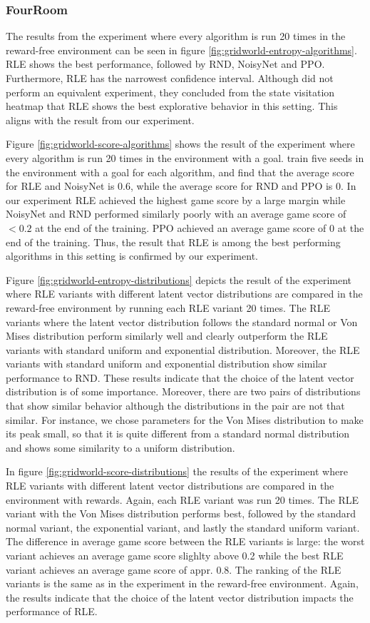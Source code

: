 \documentclass[10pt]{article} %
\begin{document}
\subsubsection{FourRoom}
The results from the experiment where every algorithm is run 20 times in the reward-free environment can be seen in figure \ref{fig:gridworld-entropy-algorithms}. RLE shows the best performance, followed by RND, NoisyNet and PPO. Furthermore, RLE has the narrowest confidence interval. Although \cite{rle-paper} did not perform an equivalent experiment, they concluded from the state visitation heatmap that RLE shows the best explorative behavior in this setting. This aligns with the result from our experiment. 

Figure \ref{fig:gridworld-score-algorithms} shows the result of the experiment where every algorithm is run 20 times in the environment with a goal. \cite{rle-paper} train five seeds in the environment with a goal for each algorithm, and find that the average score for RLE and NoisyNet is 0.6, while the average score for RND and PPO is 0. In our experiment RLE achieved the highest game score by a large margin while NoisyNet and RND performed similarly poorly with an average game score of $<0.2$ at the end of the training. PPO achieved an average game score of 0 at the end of the training. Thus, the result that RLE is among the best performing algorithms in this setting is confirmed by our experiment.

Figure \ref{fig:gridworld-entropy-distributions} depicts the result of the experiment where RLE variants with different latent vector distributions are compared in the reward-free environment by running each RLE variant 20 times. The RLE variants where the latent vector distribution follows the standard normal or Von Mises distribution perform similarly well and clearly outperform the RLE variants with standard uniform and exponential distribution. Moreover, the RLE variants with standard uniform and exponential distribution show similar performance to RND. These results indicate that the choice of the latent vector distribution is of some importance. Moreover, there are two pairs of distributions that show similar behavior although the distributions in the pair are not that similar. For instance, we chose parameters for the Von Mises distribution to make its peak small, so that it is quite different from a standard normal distribution and shows some similarity to a uniform distribution. 

In figure \ref{fig:gridworld-score-distributions} the results of the experiment where RLE variants with different latent vector distributions are compared in the environment with rewards. Again, each RLE variant was run 20 times. The RLE variant with the Von Mises distribution performs best, followed by the standard normal variant, the exponential variant, and lastly the standard uniform variant. The difference in average game score between the RLE variants is large: the worst variant achieves an average game score slighlty above 0.2 while the best RLE variant achieves an average game score of appr. 0.8. The ranking of the RLE variants is the same as in the experiment in the reward-free environment. Again, the results indicate that the choice of the latent vector distribution impacts the performance of RLE.
\end{document}

